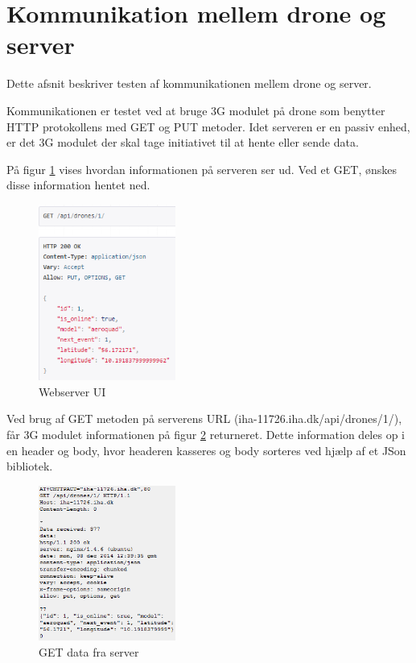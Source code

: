 \section{Kommunikation mellem drone og server}

Dette afsnit beskriver testen af kommunikationen mellem drone og server. 

Kommunikationen er testet ved at bruge 3G modulet på drone som benytter HTTP protokollens med GET og PUT metoder. 
Idet serveren er en passiv enhed, er det 3G modulet der skal tage initiativet til at hente eller sende data. 

På figur \ref{fig:integrationstest_webserver} vises hvordan informationen på serveren ser ud. Ved et GET, ønskes disse information hentet ned. 

\begin{figure}[H]
\centering
\includegraphics[width=0.4\textwidth]{Billeder/Test/integratest_webserver.png}
\caption{Webserver UI}
\label{fig:integrationstest_webserver}
\end{figure}

Ved brug af GET metoden på serverens URL (iha-11726.iha.dk/api/drones/1/), får 3G modulet informationen på figur \ref{fig:getfromserver} returneret. Dette information deles op i en header og body, hvor headeren kasseres og body sorteres ved hjælp af et JSon bibliotek.

\begin{figure}[H]
\centering
\includegraphics[width=0.4\textwidth]{Billeder/Test/getfromserver.png}
\caption{GET data fra server}
\label{fig:getfromserver}
\end{figure}